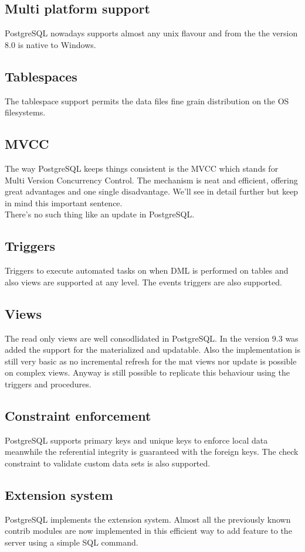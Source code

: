 \subsection{Multi platform support}
PostgreSQL nowadays supports almost any unix flavour and from
the the version 8.0 is native to Windows.

\subsection{Tablespaces}
The tablespace support permits the data files fine grain distribution on the OS
filesystems. 

\subsection{MVCC}
The way PostgreSQL keeps things consistent is the MVCC which stands for Multi
Version Concurrency Control. The mechanism is neat and efficient, offering
great advantages and one single disadvantage. We'll see in detail further but
keep in mind this important sentence. \\
There's no such thing like an update in PostgreSQL.

\subsection{Triggers}
Triggers to execute automated tasks on when DML is performed on tables and also
views are supported at any level. The events triggers are also supported.

\subsection{Views}
The read only views are well consodlidated in PostgreSQL.
In the version 9.3 was added the support for the materialized and updatable.
Also the implementation is still very basic as no incremental refresh for the
mat views nor update is possible on complex views. Anyway is still possible to
replicate this behaviour using the triggers and procedures.

\subsection{Constraint enforcement}
PostgreSQL supports primary keys and unique keys to enforce local data meanwhile
the referential integrity is guaranteed with the foreign keys.
The check constraint to validate custom data sets is also supported.

\subsection{Extension system}
PostgreSQL implements the extension system. Almost all the previously known
contrib modules are now implemented in this efficient way to add feature to the
server using a simple SQL command.
